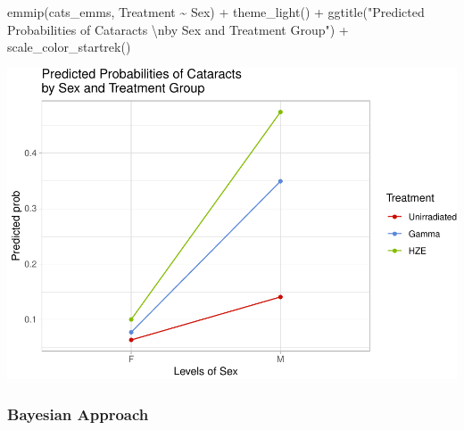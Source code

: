 \documentclass[
]{article}
\newenvironment{Shaded}{\begin{snugshade}}{\end{snugshade}}
\newcommand{\CommentTok}[1]{\textcolor[rgb]{0.56,0.35,0.01}{\textit{#1}}}
\newcommand{\DecValTok}[1]{\textcolor[rgb]{0.00,0.00,0.81}{#1}}
\newcommand{\FunctionTok}[1]{\textcolor[rgb]{0.00,0.00,0.00}{#1}}
\newcommand{\NormalTok}[1]{#1}
\newcommand{\OtherTok}[1]{\textcolor[rgb]{0.56,0.35,0.01}{#1}}
\newcommand{\SpecialCharTok}[1]{\textcolor[rgb]{0.00,0.00,0.00}{#1}}
\newcommand{\StringTok}[1]{\textcolor[rgb]{0.31,0.60,0.02}{#1}}
\begin{document}
\begin{Shaded}
\begin{Highlighting}[]
\FunctionTok{emmip}\NormalTok{(cats\_emms, Treatment }\SpecialCharTok{\textasciitilde{}}\NormalTok{ Sex) }\SpecialCharTok{+} \FunctionTok{theme\_light}\NormalTok{() }\SpecialCharTok{+} 
  \FunctionTok{ggtitle}\NormalTok{(}\StringTok{"Predicted Probabilities of Cataracts }\SpecialCharTok{\textbackslash{}n}\StringTok{by Sex and Treatment Group"}\NormalTok{) }\SpecialCharTok{+} \FunctionTok{scale\_color\_startrek}\NormalTok{()}
\end{Highlighting}
\end{Shaded}

\includegraphics{final_report_files/figure-latex/contr-1.pdf}

\begin{Shaded}
\end{Shaded}

\hypertarget{bayesian-approach}{%
\subsubsection{Bayesian Approach}\label{bayesian-approach}}
\end{document}
